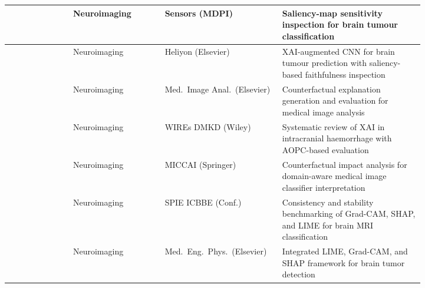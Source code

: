 \begin{longtable}{|>{\raggedright\arraybackslash}p{0.14\linewidth}|>{\raggedright\arraybackslash}p{0.20\linewidth}|>{\raggedright\arraybackslash}p{0.17\linewidth}|>{\raggedright\arraybackslash}p{0.31\linewidth}|}
\cite{Chmiel2023} & Neuroimaging & Sensors (MDPI) & Saliency-map sensitivity inspection for brain tumour classification \\
\hline
\cite{Nazir2024UtilizingCC} & Neuroimaging & Heliyon (Elsevier) & XAI-augmented CNN for brain tumour prediction with saliency-based faithfulness inspection \\
\hline
\cite{singla2023explaining} & Neuroimaging & Med.\ Image Anal.\ (Elsevier) & Counterfactual explanation generation and evaluation for medical image analysis \\
\hline
\cite{Kohan2025} & Neuroimaging & WIREs DMKD (Wiley) & Systematic review of XAI in intracranial haemorrhage with AOPC-based evaluation \\
\hline
\cite{lenis2020domain} & Neuroimaging & MICCAI (Springer) & Counterfactual impact analysis for domain-aware medical image classifier interpretation \\
\hline
\cite{qin2025consistency} & Neuroimaging & SPIE ICBBE (Conf.) & Consistency and stability benchmarking of Grad-CAM, SHAP, and LIME for brain MRI classification \\
\hline
\cite{akgundougdu2025explainable} & Neuroimaging & Med.\ Eng.\ Phys.\ (Elsevier) & Integrated LIME, Grad-CAM, and SHAP framework for brain tumor detection \\
\hline


\end{longtable}

